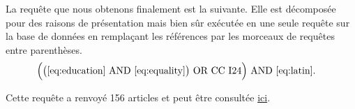\documentclass[pagesize, twoside=off, bibliography=totoc, DIV=calc, fontsize=12pt, a4paper, french]{scrartcl}
\begin{document}
La requête que nous obtenons finalement est la suivante. Elle est décomposée pour des raisons de présentation mais bien sûr exécutée en une seule requête sur la base de données en remplaçant les références par les morceaux de requêtes entre parenthèses.
\begin{equation}
  \label{eq:query}
  \left.\begin{aligned}
    &\Bigl(\bigl(\eqref{eq:education} \text{ AND } \eqref{eq:equality}\bigr) \text{ OR CC I24}\Bigr)\text{ AND }\eqref{eq:latin}.
  \end{aligned}\right.
\end{equation}

Cette requête a renvoyé 156 articles et peut être consultée \href{https://proxy.bu.dauphine.fr/login?url=https://search.ebscohost.com/login.aspx?direct=true&db=eoh&bquery=(((TI+(equality+OR+inequality+OR+egalitar*+OR+inegalitar*)+OR+SO+(equality+OR+inequality+OR+egalitar*+OR+inegalitar*)+OR+KW+(equality+OR+inequality+OR+egalitar*+OR+inegalitar*)+OR+AB+(equality+OR+inequality+OR+egalitar*+OR+inegalitar*))+AND+(TI+education+OR+SO+education+OR+KW+education+OR+AB+education))+OR+CC+I24)+AND+(TI+%26quot%3bLatin+America*%26quot%3b+OR+SO+%26quot%3bLatin+America*%26quot%3b+OR+KW+%26quot%3bLatin+America*%26quot%3b+OR+AB+%26quot%3bLatin+America*%26quot%3b)&type=0&searchMode=And&site=ehost-live&scope=site}{ici}.


\end{document}

